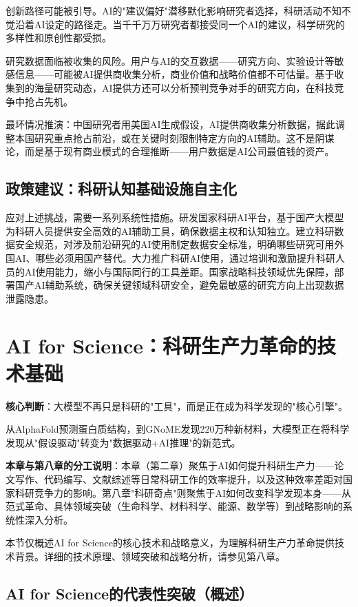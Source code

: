 创新路径可能被引导。AI的"建议偏好"潜移默化影响研究者选择，科研活动不知不觉沿着AI设定的路径走。当千千万万研究者都接受同一个AI的建议，科学研究的多样性和原创性都受损。

研究数据面临被收集的风险。用户与AI的交互数据——研究方向、实验设计等敏感信息——可能被AI提供商收集分析，商业价值和战略价值都不可估量。基于收集到的海量研究动态，AI提供方还可以分析预判竞争对手的研究方向，在科技竞争中抢占先机。

最坏情况推演：中国研究者用美国AI生成假设，AI提供商收集分析数据，据此调整本国研究重点抢占前沿，或在关键时刻限制特定方向的AI辅助。这不是阴谋论，而是基于现有商业模式的合理推断——用户数据是AI公司最值钱的资产。

\subsection{政策建议：科研认知基础设施自主化}

应对上述挑战，需要一系列系统性措施。研发国家科研AI平台，基于国产大模型为科研人员提供安全高效的AI辅助工具，确保数据主权和认知独立。建立科研数据安全规范，对涉及前沿研究的AI使用制定数据安全标准，明确哪些研究可用外国AI、哪些必须用国产替代。大力推广科研AI使用，通过培训和激励提升科研人员的AI使用能力，缩小与国际同行的工具差距。国家战略科技领域优先保障，部署国产AI辅助系统，确保关键领域科研安全，避免最敏感的研究方向上出现数据泄露隐患。


\section{AI for Science：科研生产力革命的技术基础}

\textbf{核心判断}：大模型不再只是科研的"工具"，而是正在成为科学发现的"核心引擎"。

从AlphaFold预测蛋白质结构，到GNoME发现220万种新材料，大模型正在将科学发现从"假设驱动"转变为"数据驱动+AI推理"的新范式。

\textbf{本章与第八章的分工说明}：本章（第二章）聚焦于AI如何提升科研生产力——论文写作、代码编写、文献综述等日常科研工作的效率提升，以及这种效率差距对国家科研竞争力的影响。第八章"科研奇点"则聚焦于AI如何改变科学发现本身——从范式革命、具体领域突破（生命科学、材料科学、能源、数学等）到战略影响的系统性深入分析。

本节仅概述AI for Science的核心技术和战略意义，为理解科研生产力革命提供技术背景。详细的技术原理、领域突破和战略分析，请参见第八章。

\subsection{AI for Science的代表性突破（概述）}

